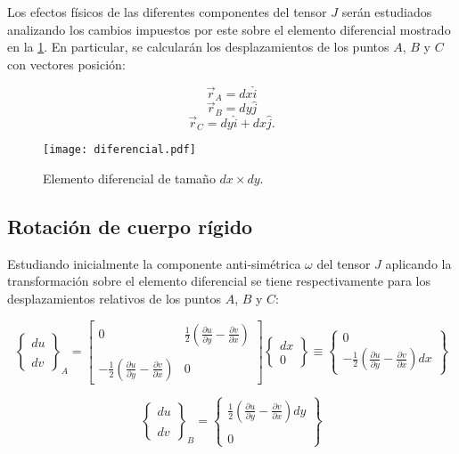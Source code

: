 \documentclass[../notas medios.tex]{subfiles}
\begin{document}
Los efectos físicos de las diferentes componentes del tensor $J$ serán estudiados analizando los cambios impuestos por este sobre el elemento diferencial mostrado en la \cref{diferencial}. En particular, se calcularán los desplazamientos de los puntos $A$, $B$ y $C$ con vectores posición:

\[{\vec r_A} = dx\hat i\]
\[{\vec r_B} = dy\hat j\]
\[{\vec r_C} = dy\hat i + dx\hat j. \]


\begin{figure}[H]
\centering
	\texttt{[image: diferencial.pdf]}
	\caption{Elemento diferencial de tamaño $dx \times dy$.}
	\label{diferencial}
\end{figure}


\subsection{Rotación de cuerpo rígido}
Estudiando inicialmente la componente anti-simétrica $\omega$ del tensor $J$ aplicando la transformación sobre el elemento diferencial se tiene respectivamente para los desplazamientos relativos de los puntos $A$, $B$ y $C$:

\[{\left\{ {\begin{array}{*{20}{c}}
{du}\\\\
{dv}
\end{array}} \right\}_A} = \left[ {\begin{array}{*{20}{c}}
0&{\frac{1}{2}\left( {\frac{{\partial u}}{{\partial y}} - \frac{{\partial v}}{{\partial x}}} \right)}\\\\
{ - \frac{1}{2}\left( {\frac{{\partial u}}{{\partial y}} - \frac{{\partial v}}{{\partial x}}} \right)}&0
\end{array}} \right]\left\{ {\begin{array}{*{20}{c}}
{dx}\\
0
\end{array}} \right\} \equiv \left\{ {\begin{array}{*{20}{c}}
0\\
{ - \frac{1}{2}\left( {\frac{{\partial u}}{{\partial y}} - \frac{{\partial v}}{{\partial x}}} \right)dx}
\end{array}} \right\}\]

\[{\left\{ {\begin{array}{*{20}{c}}
{du}\\\\
{dv}
\end{array}} \right\}_B} = \left\{ {\begin{array}{*{20}{c}}
{\frac{1}{2}\left( {\frac{{\partial u}}{{\partial y}} - \frac{{\partial v}}{{\partial x}}} \right)dy}\\\\
0
\end{array}} \right\}\]
\end{document}
